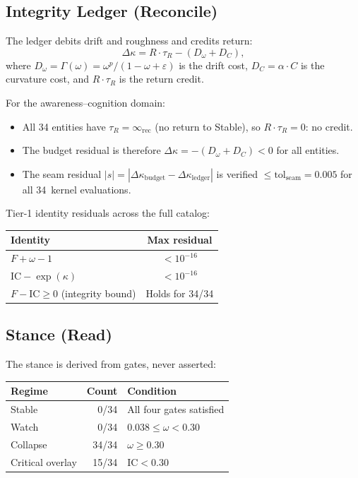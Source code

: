 \documentclass[
  aps,
  prd,
  twocolumn,
  superscriptaddress,
  nofootinbib,
  floatfix
]{revtex4-2}
\newcommand{\eps}{\varepsilon}
\newcommand{\beq}{\begin{equation}}
\newcommand{\eeq}{\end{equation}}
\newcommand{\IC}{\mathrm{IC}}
\begin{document}
\subsection{Integrity Ledger (Reconcile)}

The ledger debits drift and roughness and credits return:
\beq\label{eq:budget}
  \Delta\kappa = R \cdot \tau_R - (D_\omega + D_C),
\eeq
where $D_\omega = \Gamma(\omega)
= \omega^p / (1 - \omega + \eps)$ is the drift cost,
$D_C = \alpha \cdot C$ is the curvature cost, and
$R \cdot \tau_R$ is the return credit.

For the awareness--cognition domain:
\begin{itemize}
\item All 34 entities have $\tau_R = \infty_{\mathrm{rec}}$
  (no return to Stable), so $R \cdot \tau_R = 0$: no credit.
\item The budget residual is therefore
  $\Delta\kappa = -(D_\omega + D_C) < 0$ for all entities.
\item The seam residual $|s| =
  |\Delta\kappa_{\mathrm{budget}}
  - \Delta\kappa_{\mathrm{ledger}}|$ is verified
  $\leq \mathrm{tol}_{\mathrm{seam}} = 0.005$ for all
  34~kernel evaluations.
\end{itemize}

Tier-1 identity residuals across the full catalog:
\begin{center}
\small
\begin{tabular}{lc}
\toprule
Identity & Max residual \\
\midrule
$F + \omega - 1$ & $< 10^{-16}$ \\
$\IC - \exp(\kappa)$ & $< 10^{-16}$ \\
$F - \IC \geq 0$ (integrity bound) & Holds for 34/34 \\
\bottomrule
\end{tabular}
\end{center}

\subsection{Stance (Read)}

The stance is derived from gates, never asserted:

\begin{center}
\small
\begin{tabular}{lrl}
\toprule
Regime & Count & Condition \\
\midrule
Stable & 0/34 & All four gates satisfied \\
Watch & 0/34 & $0.038 \leq \omega < 0.30$ \\
Collapse & 34/34 & $\omega \geq 0.30$ \\
Critical overlay & 15/34 & $\IC < 0.30$ \\
\bottomrule
\end{tabular}
\end{center}
\end{document}
